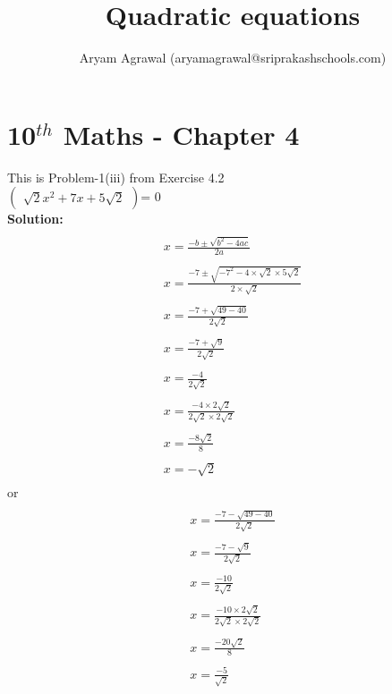 \documentclass[12pt]{article}
\title{Quadratic equations}
\author{Aryam Agrawal (aryamagrawal@sriprakashschools.com)}
\newcommand{\myvec}[1]{\ensuremath{\begin{pmatrix}#1\end{pmatrix}}}
\newcommand{\solution}{\noindent \textbf{Solution: }}
\begin{document}
\section*{10$^{th}$ Maths - Chapter 4}
This is Problem-1(iii) from Exercise 4.2\\
\myvec{{\sqrt{2}}x^2+{7} x +{5\sqrt{2}} }= 0\\
\solution\\
\begin{align}
\\{x=\frac{-b\pm\sqrt{b^2-4ac}}{2a}}\\
\\{x=\frac{-7\pm\sqrt{-7^2-4 \times \sqrt{2}\times5\sqrt{2}}}{2 \times \sqrt{2}}}\\
\\{x=\frac{-7+\sqrt{49-40}}{2\sqrt{2}}}\\
\\{x=\frac{-7+\sqrt{9}}{2\sqrt{2}}}\\
\\{x=\frac{-4}{2\sqrt{2}}}\\
\\{x=\frac{-4\times 2\sqrt{2}}{2\sqrt{2}\times2\sqrt{2}}}\\
\\{x=\frac{-8\sqrt{2}}{8}}\\
\\{x=-\sqrt{2}}\\
\end{align}
or\\
\begin{align}
\\{x=\frac{-7-\sqrt{49-40}}{2\sqrt{2}}}\\
\\{x=\frac{-7-\sqrt{9}}{2\sqrt{2}}}\\
\\{x=\frac{-10}{2\sqrt{2}}}\\
\\{x=\frac{-10\times 2\sqrt{2}}{2\sqrt{2}\times2\sqrt{2}}}\\
\\{x=\frac{-20\sqrt{2}}{8}}\\
\\{x=\frac{-5}{\sqrt{2}}}
\end{align}
\end{document}
